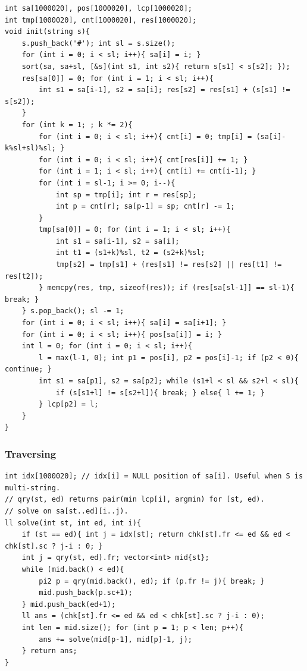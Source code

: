 \begin{verbatim}
int sa[1000020], pos[1000020], lcp[1000020];
int tmp[1000020], cnt[1000020], res[1000020];
void init(string s){
	s.push_back('#'); int sl = s.size();
	for (int i = 0; i < sl; i++){ sa[i] = i; }
	sort(sa, sa+sl, [&s](int s1, int s2){ return s[s1] < s[s2]; });
	res[sa[0]] = 0; for (int i = 1; i < sl; i++){
		int s1 = sa[i-1], s2 = sa[i]; res[s2] = res[s1] + (s[s1] != s[s2]);
	}
	for (int k = 1; ; k *= 2){
		for (int i = 0; i < sl; i++){ cnt[i] = 0; tmp[i] = (sa[i]-k%sl+sl)%sl; }
		for (int i = 0; i < sl; i++){ cnt[res[i]] += 1; }
		for (int i = 1; i < sl; i++){ cnt[i] += cnt[i-1]; }
		for (int i = sl-1; i >= 0; i--){
			int sp = tmp[i]; int r = res[sp];
			int p = cnt[r]; sa[p-1] = sp; cnt[r] -= 1;
		}
		tmp[sa[0]] = 0; for (int i = 1; i < sl; i++){
			int s1 = sa[i-1], s2 = sa[i];
			int t1 = (s1+k)%sl, t2 = (s2+k)%sl;
			tmp[s2] = tmp[s1] + (res[s1] != res[s2] || res[t1] != res[t2]);
		} memcpy(res, tmp, sizeof(res)); if (res[sa[sl-1]] == sl-1){ break; }
	} s.pop_back(); sl -= 1;
	for (int i = 0; i < sl; i++){ sa[i] = sa[i+1]; }
	for (int i = 0; i < sl; i++){ pos[sa[i]] = i; }
	int l = 0; for (int i = 0; i < sl; i++){
		l = max(l-1, 0); int p1 = pos[i], p2 = pos[i]-1; if (p2 < 0){ continue; }
		int s1 = sa[p1], s2 = sa[p2]; while (s1+l < sl && s2+l < sl){
			if (s[s1+l] != s[s2+l]){ break; } else{ l += 1; }
		} lcp[p2] = l;
	}
}
\end{verbatim}

\subsubsection*{Traversing}
\begin{verbatim}
int idx[1000020]; // idx[i] = NULL position of sa[i]. Useful when S is multi-string.
// qry(st, ed) returns pair(min lcp[i], argmin) for [st, ed).
// solve on sa[st..ed][i..j).
ll solve(int st, int ed, int i){
	if (st == ed){ int j = idx[st]; return chk[st].fr <= ed && ed < chk[st].sc ? j-i : 0; }
	int j = qry(st, ed).fr; vector<int> mid{st};
	while (mid.back() < ed){
		pi2 p = qry(mid.back(), ed); if (p.fr != j){ break; }
		mid.push_back(p.sc+1);
	} mid.push_back(ed+1);
	ll ans = (chk[st].fr <= ed && ed < chk[st].sc ? j-i : 0);
	int len = mid.size(); for (int p = 1; p < len; p++){
		ans += solve(mid[p-1], mid[p]-1, j);
	} return ans;
}
\end{verbatim}